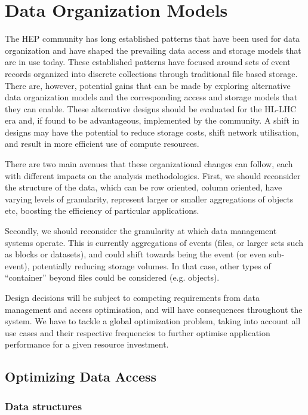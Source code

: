 \documentclass[12pt,a4paper]{article}
\begin{document}
\section{Data Organization Models}\label{data-organization-models}

The HEP community has long established patterns that have been used for
data organization and have shaped the prevailing data access and storage
models that are in use today. These established patterns have focused
around sets of event records organized into discrete collections through
traditional file based storage. There are, however, potential gains that
can be made by exploring alternative data organization models and the
corresponding access and storage models that they can enable. These
alternative designs should be evaluated for the HL-LHC era and, if found
to be advantageous, implemented by the community. A shift in designs may
have the potential to reduce storage costs, shift network utilisation,
and result in more efficient use of compute resources.

There are two main avenues that these organizational changes can follow,
each with different impacts on the analysis methodologies. First, we
should reconsider the structure of the data, which can be row oriented,
column oriented, have varying levels of granularity, represent larger or
smaller aggregations of objects etc, boosting the efficiency of
particular applications.

Secondly, we should reconsider the granularity at which data management
systems operate. This is currently aggregations of events (files, or
larger sets such as blocks or datasets), and could shift towards being
the event (or even sub-event), potentially reducing storage volumes. In
that case, other types of ``container'' beyond files could be considered
(e.g. objects).

Design decisions will be subject to competing requirements from data
management and access optimisation, and will have consequences
throughout the system. We have to tackle a global optimization problem,
taking into account all use cases and their respective frequencies to
further optimise application performance for a given resource
investment.

\subsection{Optimizing Data Access}\label{optimizing-data-access}

\subsubsection{Data structures}\label{data-structures}
\end{document}
